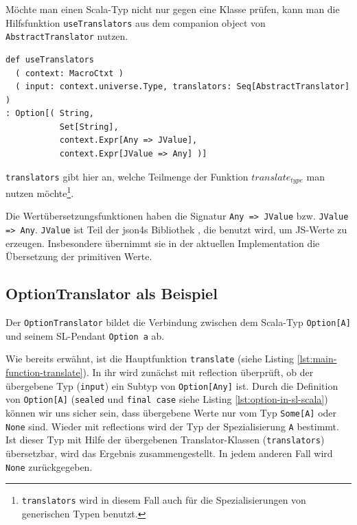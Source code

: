 \documentclass[12pt,bibtotoc]{scrreprt}
\begin{document}
Möchte man einen Scala-Typ nicht nur gegen eine Klasse prüfen, kann man die Hilfsfunktion \lstinline!useTranslators! aus dem companion object von \lstinline!AbstractTranslator! nutzen.

\begin{lstlisting}[caption=Statische Hilfsfunktion in AbstractTranslator, label=lst:hilfsfunktionen]
def useTranslators
  ( context: MacroCtxt )
  ( input: context.universe.Type, translators: Seq[AbstractTranslator] )
: Option[( String,
           Set[String], 
           context.Expr[Any => JValue], 
           context.Expr[JValue => Any] )]
\end{lstlisting}

\lstinline!translators! gibt hier an, welche Teilmenge der Funktion $translate_{type}$ man nutzen möchte\footnote{\lstinline!translators! wird in diesem Fall auch für die Spezialisierungen von generischen Typen benutzt.}. 

Die Wertübersetzungsfunktionen haben die Signatur \lstinline!Any => JValue! bzw. \lstinline!JValue => Any!. \lstinline!JValue! ist Teil der json4s Bibliothek \cite{Json4s}, die benutzt wird, um JS-Werte zu erzeugen. Insbesondere übernimmt sie in der aktuellen Implementation die Übersetzung der primitiven Werte.

\subsection{OptionTranslator als Beispiel}
\label{subsec:example-option-translator}

Der \lstinline!OptionTranslator! bildet die Verbindung zwischen dem Scala-Typ \lstinline!Option[A]! und seinem SL-Pendant \lstinline!Option a! ab. 

Wie bereits erwähnt, ist die Hauptfunktion \lstinline!translate! (siehe Listing \ref{lst:main-function-translate}). In ihr wird zunächst mit reflection überprüft, ob der übergebene Typ (\lstinline!input!) ein Subtyp von \lstinline!Option[Any]! ist. Durch die Definition von \lstinline!Option[A]! (\lstinline!sealed! und \lstinline!final case! siehe Listing \ref{lst:option-in-sl-scala}) können wir uns sicher sein, dass übergebene Werte nur vom Typ \lstinline!Some[A]! oder \lstinline!None! sind. Wieder mit reflections wird der Typ der Spezialisierung \lstinline!A! bestimmt. Ist dieser Typ mit Hilfe der übergebenen Translator-Klassen (\lstinline!translators!) übersetzbar, wird das Ergebnis zusammengestellt. In jedem anderen Fall wird \lstinline!None! zurückgegeben.
\end{document}
